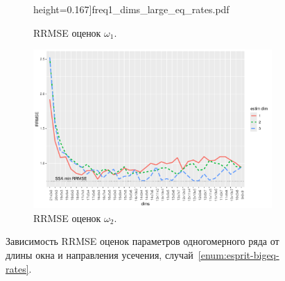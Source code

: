 \documentclass[specialist,
  substylefile=spbu_report.rtx,
subf,href,colorlinks=true, 12pt]{disser}
\theoremstyle{plain}
\theoremstyle{definition}
\theoremstyle{remark}
\begin{document}
\begin{figure}[!ht]
\begin{subfigure}{0.49\linewidth}
    height=0.167\textheight]{freq1_dims_large_eq_rates.pdf}
    \caption{RRMSE оценок $\omega_1$.}
    \label{fig:freq1_dims_large_eq_rates}
  \end{subfigure}
  \begin{subfigure}{0.49\linewidth}
    \includegraphics[width=\linewidth,
    height=0.167\textheight]{freq2_dims_large_eq_rates.pdf}
    \caption{RRMSE оценок $\omega_2$.}
    \label{fig:freq2_dims_large_eq_rates}
  \end{subfigure}
  \caption{Зависимость RRMSE оценок параметров одногомерного ряда
    от длины окна и направления усечения,
  случай~\ref{enum:esprit-bigeq-rates}.}
  \label{fig:dims_large_eq_rates}
\end{figure}
\end{document}

